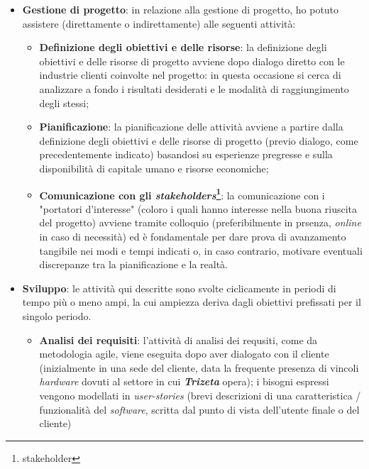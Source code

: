 \begin{itemize}
    \item \textbf{Gestione di progetto}: in relazione alla gestione di progetto, ho potuto assistere (direttamente o indirettamente) alle seguenti attività:
        \begin{itemize}
            \item \textbf{Definizione degli obiettivi e delle risorse}: la definizione degli obiettivi e delle risorse di progetto avviene dopo dialogo diretto con le industrie clienti coinvolte nel progetto: in questa occasione si cerca di analizzare a fondo 
                i risultati desiderati e le modalità di raggiungimento degli stessi;
            \item \textbf{Pianificazione}: la pianificazione delle attività avviene a partire dalla definizione degli obiettivi e delle risorse di progetto (previo dialogo, come precedentemente indicato) 
                basandosi su esperienze pregresse e sulla disponibilità di capitale umano e risorse economiche;
            \item \textbf{Comunicazione con gli \textit{stakeholders}\footnote{\gls{stakeholder}}}: la comunicazione con i "portatori d'interesse" (coloro i quali hanno interesse nella buona riuscita del progetto) avviene tramite colloquio (preferibilmente in prsenza, 
                \textit{online} in caso di necessità) ed è fondamentale per dare prova di avanzamento tangibile nei modi e tempi indicati o, in caso contrario, motivare eventuali discrepanze tra la pianificazione e la realtà.
        \end{itemize}
    \item \textbf{Sviluppo}: le attività qui descritte sono svolte ciclicamente in periodi di tempo più o meno ampi, la cui ampiezza deriva dagli obiettivi prefissati per il singolo periodo.
        \begin{itemize}
            \item \textbf{Analisi dei requisiti}: l'attività di analisi dei requsiti, come da metodologia agile, viene eseguita dopo aver dialogato con il cliente (inizialmente in una sede del cliente,
                data la frequente presenza di vincoli \textit{hardware} dovuti al settore in cui \textit{\textbf{Trizeta}} opera); i bisogni espressi vengono modellati in \textit{user-stories} (brevi descrizioni di una caratteristica / funzionalità del \textit{software}, scritta dal punto di vista dell'utente finale o del cliente)

\end{itemize}
\end{itemize}
